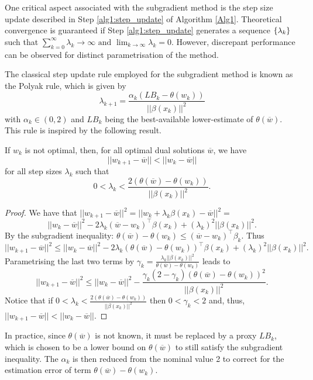 One critical aspect associated with the subgradient method is the step size update described in Step \ref{alg1:step_update} of Algorithm \ref{Alg1}. Theoretical convergence is guaranteed if Step \ref{alg1:step_update} generates a sequence $\left\{ \lambda_k \right \}$ such that
$\sum_{k=0}^{\infty}\lambda_k \rightarrow \infty \text{ and } \lim_{k \rightarrow \infty}\lambda_k = 0$. However, discrepant performance can be observed for distinct parametrisation of the method.

The classical step update rule employed for the subgradient method is known as the Polyak rule, which is given by
$$
\lambda_{k+1} = \frac{\alpha_k(LB_k - \theta(w_k))}{||\beta(x_k)||^2}
$$ 
with $\alpha_k \in (0,2)$ and $LB_k$ being the best-available lower-estimate of $\theta(\overline{w})$. This rule is inspired by the following result.

\begin{proposition}
If $w_k$ is not optimal, then, for all optimal dual solutions $\overline{w}$, we have
\vspace{-6pt}
%
$$|| w_{k+1} - \overline{w}|| < || w_{k} - \overline{w}||$$
%
\vspace{-6pt}
for all step sizes $\lambda_k$ such that 
%
$$0 < \lambda_k < \frac{2(\theta(\overline{w}) - \theta(w_k))}{||\beta(x_k)||^2}.$$
\end{proposition}

\begin{proof}
We have that $|| w_{k+1} - \overline{w} ||^2 = || w_k + \lambda_k\beta(x_k) - \overline{w} ||^2 = $ 
%
$$|| w_{k} - \overline{w}||^2 - 2\lambda_k(\overline{w} - w_k)^\top \beta(x_k) + (\lambda_k)^2||\beta(x_k)||^2.$$
%
By the subgradient inequality: $\theta(\overline{w}) - \theta(w_k) \leq (\overline{w} - w_k)^\top \beta_k$. Thus
%
$$|| w_{k+1} - \overline{w} ||^2 \leq || w_{k} - \overline{w}||^2 - 2\lambda_k(\theta(\overline{w}) - \theta(w_k))^\top \beta(x_k) + (\lambda_k)^2||\beta(x_k)||^2.$$
%
Parametrising the last two terms by $\gamma_k = \frac{\lambda_k ||\beta(x_k)||^2}{\theta(\overline{w}) - \theta(w_k)}$ leads to
%
$$|| w_{k+1} - \overline{w} ||^2 \leq || w_{k} - \overline{w} ||^2 - \frac{\gamma_k(2-\gamma_k)(\theta(\overline{w}) - \theta(w_k))^2}{||\beta(x_k)||^2}.$$
%
Notice that if $0 < \lambda_k < \frac{2(\theta(\overline{w}) - \theta(w_k))}{||\beta(x_k)||^2}$ then $0 < \gamma_k < 2$ and, thus, $|| w_{k+1} - \overline{w}|| < || w_{k} - \overline{w}||$.
\end{proof}

In practice, since $\theta(\overline{w})$ is not known, it must be replaced by a proxy $LB_k$, which is chosen to be a lower bound on $\theta(\overline{w})$ to still satisfy the subgradient inequality. The $\alpha_k$ is then reduced from the nominal value 2 to correct for the estimation error of term $\theta(\overline{w}) - \theta(w_k)$.

